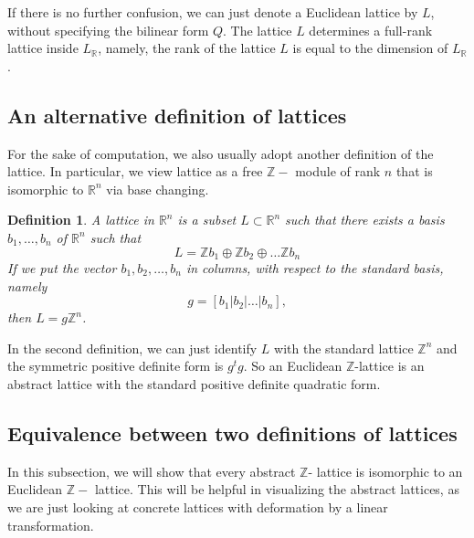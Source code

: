 \documentclass[12pt]{article} %
\newtheorem{definition}{Definition}[section]
\newcommand{\tpoint}[1]{\subsection{#1}}
\begin{document}
If there is no further confusion, we can just denote a Euclidean lattice by $L$, without specifying the bilinear form
$Q$. The lattice $L$ determines a full-rank lattice inside $L_\mathbb{R}$, namely, the rank
of the lattice $L$ is equal to the dimension of $L_\mathbb{R}$.

\tpoint{An alternative definition of lattices}
For the sake of computation, we also usually adopt another definition of the lattice.
In particular, we view lattice as a free $\mathbb{Z}-$ module of rank $n$ that is isomorphic
to $\mathbb{R}^n$ via base changing.
\begin{definition}\label{lattice2}
    A \textit{lattice} in $\mathbb{R}^n$ is a subset $L \subset \mathbb{R}^n$ such that there exists
    a basis $b_1,\ldots,b_n$ of $\mathbb{R}^n$ such that
    \[L = \mathbb{Z}b_1\oplus \mathbb{Z}b_2\oplus \ldots \mathbb{Z}b_n\]
    If we put the vector $b_1,b_2,\ldots,b_n$ in columns, with respect to the standard basis, namely
    \[g = [b_1 | b_2 | \ldots | b_n] ,\]
    then $L = g\mathbb{Z}^n$.
\end{definition}
In the second definition, we can just identify $L$ with the standard lattice $\mathbb{Z}^n$ and the
symmetric positive definite form is $g^tg$. So an Euclidean $\mathbb{Z}$-lattice is an abstract lattice with the standard
positive definite quadratic form.
\tpoint{Equivalence between two definitions of lattices}
In this subsection, we will show that every abstract $\mathbb{Z}$- lattice is isomorphic to an Euclidean $\mathbb{Z}-$ lattice.
This will be helpful in visualizing the abstract lattices, as we are just looking at concrete lattices with deformation by a linear transformation.
\end{document}
